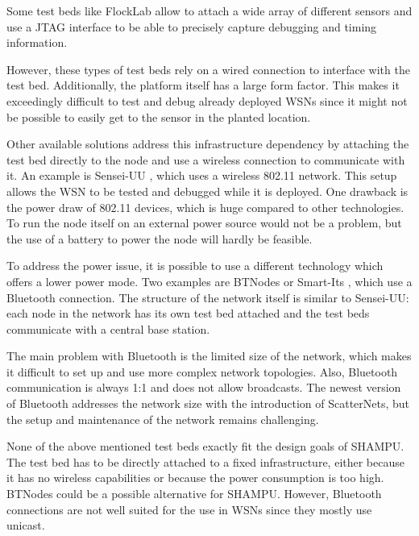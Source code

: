Some test beds like FlockLab \cite{Lim2013} allow to attach a wide array of different sensors and use a JTAG interface to be able to precisely capture debugging and timing information.

However, these types of test beds rely on a wired connection to interface with the test bed. Additionally, the platform itself has a large form factor. This makes it exceedingly difficult to test and debug already deployed WSNs since it might not be possible to easily get to the sensor in the planted location.

Other available solutions address this infrastructure dependency by attaching the test bed directly to the node and use a wireless connection to communicate with it. An example is Sensei-UU \cite{Rensfelt2009}, which uses a wireless 802.11 network. This setup allows the WSN to be tested and debugged while it is deployed. One drawback is the power draw of 802.11 devices, which is huge compared to other technologies. To run the node itself on an external power source would not be a problem, but the use of a battery to power the node will hardly be feasible.

To address the power issue, it is possible to use a different technology which offers a lower power mode. Two examples are BTNodes \cite{Moser} or Smart-Its \cite{Kasten2000}, which use a Bluetooth connection. 
The structure of the network itself is similar to Sensei-UU: each node in the network has its own test bed attached and the test beds communicate with a central base station.

The main problem with Bluetooth is the limited size of the network, which makes it difficult to set up and use more complex network topologies. Also, Bluetooth communication is always 1:1 and does not allow broadcasts. The newest version of Bluetooth addresses the network size with the introduction of ScatterNets, but the setup and maintenance of the network remains challenging.

None of the above mentioned test beds exactly fit the design goals of SHAMPU. The test bed has to be directly attached to a fixed infrastructure, either because it has no wireless capabilities or because the power consumption is too high. BTNodes could be a possible alternative for SHAMPU. However, Bluetooth connections are not well suited for the use in WSNs since they mostly use unicast.
